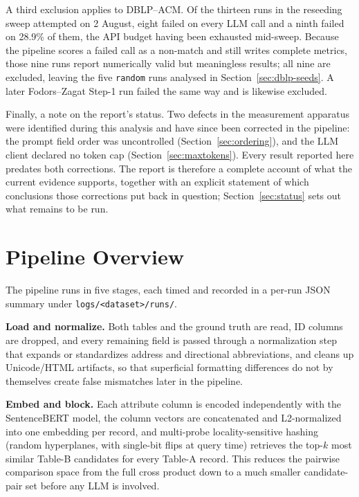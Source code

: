 \documentclass[11pt]{article}
\begin{document}
A third exclusion applies to DBLP--ACM. Of the thirteen runs in the reseeding sweep
attempted on 2 August, eight failed on every LLM call and a ninth failed on 28.9\% of
them, the API budget having been exhausted mid-sweep. Because the pipeline scores a
failed call as a non-match and still writes complete metrics, those nine runs report
numerically valid but meaningless results; all nine are excluded, leaving the five
\texttt{random} runs analysed in Section~\ref{sec:dblp-seeds}. A later Fodors--Zagat
Step-1 run failed the same way and is likewise excluded.

Finally, a note on the report's status. Two defects in the measurement apparatus were
identified during this analysis and have since been corrected in the pipeline: the
prompt field order was uncontrolled (Section~\ref{sec:ordering}), and the LLM client
declared no token cap (Section~\ref{sec:maxtokens}). Every result reported here
predates both corrections. The report is therefore a complete account of what the
current evidence supports, together with an explicit statement of which conclusions
those corrections put back in question; Section~\ref{sec:status} sets out what
remains to be run.

\section{Pipeline Overview}

The pipeline runs in five stages, each timed and recorded in a per-run JSON summary
under \texttt{logs/<dataset>/runs/}.

\textbf{Load and normalize.} Both tables and the ground truth are read, ID columns
are dropped, and every remaining field is passed through a normalization step that
expands or standardizes address and directional abbreviations, and cleans up
Unicode/HTML artifacts, so that superficial formatting differences do not by
themselves create false mismatches later in the pipeline.

\textbf{Embed and block.} Each attribute column is encoded independently with the
SentenceBERT model, the column vectors are concatenated and L2-normalized into one
embedding per record, and multi-probe locality-sensitive hashing (random
hyperplanes, with single-bit flips at query time) retrieves the top-$k$ most similar
Table-B candidates for every Table-A record. This reduces the pairwise comparison
space from the full cross product down to a much smaller candidate-pair set before
any LLM is involved.
\end{document}
